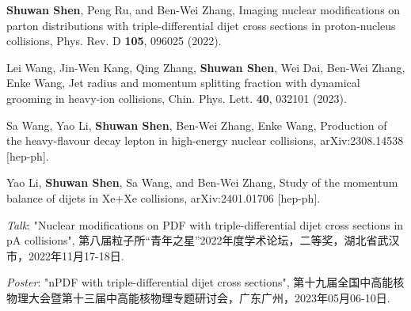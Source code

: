 \publication


\begin{publications}

  \item 
  {\bf Shuwan Shen}, Peng Ru, and Ben-Wei Zhang, 
  Imaging nuclear modifications on parton distributions with triple-differential dijet cross sections in proton-nucleus collisions, 
  Phys. Rev. D {\bf 105}, 096025 (2022).
  \item 
  Lei Wang, Jin-Wen Kang, Qing Zhang, {\bf Shuwan Shen}, Wei Dai, Ben-Wei Zhang, Enke Wang, 
  Jet radius and momentum splitting fraction with dynamical grooming in heavy-ion collisions, 
  Chin. Phys. Lett. {\bf 40}, 032101 (2023).
  \item 
  Sa Wang, Yao Li, {\bf Shuwan Shen}, Ben-Wei Zhang, Enke Wang, Production of the heavy-flavour decay lepton in high-energy nuclear collisions, arXiv:2308.14538 [hep-ph].
  \item 
  Yao Li, {\bf Shuwan Shen}, Sa Wang, and Ben-Wei Zhang, Study of the momentum balance of dijets in Xe+Xe collisions, arXiv:2401.01706 [hep-ph].
  \item    
  \emph{Talk}: "Nuclear modifications on PDF with triple-differential dijet cross sections in pA collisions",
  第八届粒子所“青年之星”2022年度学术论坛，二等奖，湖北省武汉市，2022年11月17-18日.
  \item 
  \emph{Poster}: "nPDF with triple-differential dijet cross sections",
  第十九届全国中高能核物理大会暨第十三届中高能核物理专题研讨会，广东广州，2023年05月06-10日.


\end{publications}